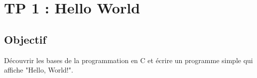 
\section{TP 1 : Hello World}
\subsection{Objectif}
Découvrir les bases de la programmation en C et écrire un programme simple qui affiche "Hello, World!".